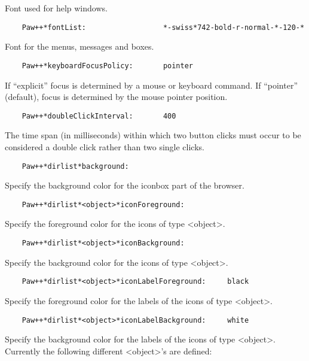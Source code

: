    Font used for help windows.

\begin{verbatim}
    Paw++*fontList:                  *-swiss*742-bold-r-normal-*-120-*
\end{verbatim}

   Font for the menus, messages and boxes.

\begin{verbatim}
    Paw++*keyboardFocusPolicy:       pointer
\end{verbatim}

   If ``explicit'' focus is determined by a mouse or keyboard command.  If
   ``pointer'' (default), focus is determined by the mouse pointer position.

\begin{verbatim}
    Paw++*doubleClickInterval:       400
\end{verbatim}

   The time span (in milliseconds) within which two button clicks must occur
   to be considered a double click rather than two single clicks.

\begin{verbatim}
    Paw++*dirlist*background:
\end{verbatim}

   Specify the background color for the iconbox part of the browser.

\begin{verbatim}
    Paw++*dirlist*<object>*iconForeground:
\end{verbatim}

   Specify the foreground color for the icons of type <object>.

\begin{verbatim}
    Paw++*dirlist*<object>*iconBackground:
\end{verbatim}

   Specify the background color for the icons of type <object>.

\begin{verbatim}
    Paw++*dirlist*<object>*iconLabelForeground:     black
\end{verbatim}

   Specify the foreground color for the labels of the icons of type <object>.

\begin{verbatim}
    Paw++*dirlist*<object>*iconLabelBackground:     white
\end{verbatim}

   Specify the background color for the labels of the icons of type <object>.
   Currently the following different <object>'s are defined:

